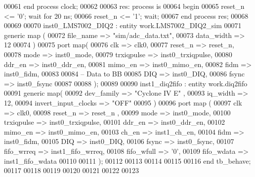 \begin{DoxyCode}
00061     \textcolor{keywordflow}{end} \textcolor{keywordflow}{process} \textcolor{vhdlchar}{clock};
00062     
00063         res: \textcolor{keywordflow}{process} \textcolor{keywordflow}{is}
00064 \textcolor{vhdlkeyword}{    begin}
00065         \textcolor{vhdlchar}{reset_n} \textcolor{vhdlchar}{<=} \textcolor{vhdlchar}{'}\textcolor{vhdllogic}{}\textcolor{vhdllogic}{0}\textcolor{vhdlchar}{'}; \textcolor{keywordflow}{wait} \textcolor{keywordflow}{for} \textcolor{vhdllogic}{}\textcolor{vhdllogic}{20} \textcolor{vhdlchar}{ns};
00066         \textcolor{vhdlchar}{reset_n} \textcolor{vhdlchar}{<=} \textcolor{vhdlchar}{'}\textcolor{vhdllogic}{}\textcolor{vhdllogic}{1}\textcolor{vhdlchar}{'}; \textcolor{keywordflow}{wait};
00067     \textcolor{keywordflow}{end} \textcolor{keywordflow}{process} \textcolor{vhdlchar}{res};
00068     
00069   
00070 inst0\_LMS7002\_DIQ2 : \textcolor{keywordflow}{entity} work.LMS7002_DIQ2_sim 
00071 \textcolor{keywordflow}{generic} \textcolor{keywordflow}{map} (
00072     file_name => \textcolor{keyword}{"sim/adc\_data.txt"},
00073     data_width => \textcolor{vhdllogic}{12}
00074 \textcolor{vhdlchar}{)}
00075 \textcolor{keywordflow}{port} \textcolor{keywordflow}{map}(
00076     clk         => clk0,
00077     reset_n     => reset_n, 
00078     mode            => inst0_mode,
00079     trxiqpulse  => inst0_trxiqpulse,
00080     ddr_en      => inst0_ddr_en, 
00081     mimo_en     => inst0_mimo_en,
00082     fidm            => inst0_fidm, 
00083 
00084 \textcolor{keyword}{    -- Data to BB}
00085     DIQ             => inst0_DIQ,
00086     fsync           => inst0_fsync
00087     
00088     \textcolor{vhdlchar}{)};
00089     
00090 inst1\_diq2fifo : \textcolor{keywordflow}{entity} work.diq2fifo
00091     \textcolor{keywordflow}{generic} \textcolor{keywordflow}{map}( 
00092       dev_family                => \textcolor{keyword}{"Cyclone IV E"}  ,
00093       iq_width                  => \textcolor{vhdllogic}{12},
00094       invert_input_clocks   => \textcolor{keyword}{"OFF"}
00095     \textcolor{vhdlchar}{)}
00096     \textcolor{keywordflow}{port} \textcolor{keywordflow}{map} (
00097       clk         => clk0,
00098       reset_n     => reset_n ,
00099       mode          => inst0_mode,
00100         trxiqpulse  => inst0_trxiqpulse,
00101         ddr_en      => inst0_ddr_en,
00102         mimo_en     => inst0_mimo_en,
00103         ch_en           => inst1_ch_en,
00104         fidm            => inst0_fidm,
00105       DIQ           => inst0_DIQ,
00106         fsync          => inst0_fsync,
00107       fifo_wrreq  => inst1_fifo_wrreq,
00108       fifo_wfull  => '0',
00109       fifo_wdata  => inst1_fifo_wdata
00110      
00111         \textcolor{vhdlchar}{)};
00112     
00113 
00114     
00115     
00116     \textcolor{keywordflow}{end} \textcolor{vhdlchar}{tb\_behave};
00117    
00118    
00119   
00120   
00121 
00122 
00123   
\end{DoxyCode}
